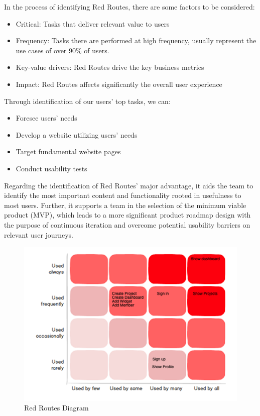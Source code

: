 \documentclass[a4paper,twoside,10pt]{report}
\begin{document}
In the process of identifying Red Routes, there are some factors to be considered:
\begin{itemize}
	\item  Critical: Tasks that deliver relevant value to users
 	\item Frequency: Tasks there are performed at high frequency, usually represent the use cases of over 90\% of users.
 	\item Key-value drivers: Red Routes drive the key business metrics
 	\item  Impact: Red Routes affects significantly the overall user experience
\end{itemize}
Through identification of our users' top tasks, we can:
\begin{itemize}
	\item Foresee users' needs
	\item Develop a website utilizing users' needs
	\item Target fundamental website pages
	\item Conduct usability tests
\end{itemize}	
Regarding the identification of Red Routes' major advantage, it aids the team to identify the most important content and functionality rooted in usefulness to most users.  Further, it supports a team in the selection of the minimum viable product (MVP), which leads to a more significant product roadmap design with the purpose of continuous iteration and overcome potential usability barriers on relevant user journeys. 
\begin{figure}[h!]
\center
    \includegraphics[width=\textwidth]{red-routes-diagram.png}
\caption{Red Routes Diagram}
\end{figure}
\newpage
\end{document}
